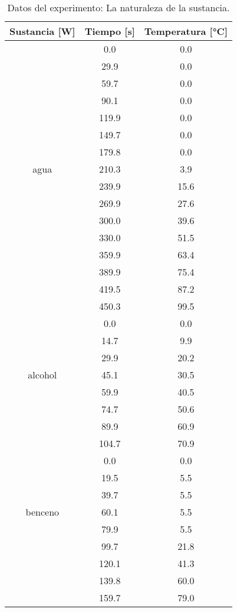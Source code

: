 \documentclass[a4paper, 12p]{article}
\begin{document}
\begin{table}[H]
      \centering
      \begin{tabular}{|c|c|c|}\hline
            Sustancia [W]& Tiempo [s] & Temperatura [°C]\\ \hline
                            &  0.0  &0.0\\
                            & 29.9  &0.0\\
                            & 59.7  &0.0\\
                            & 90.1  &0.0\\
                            & 119.9 &0.0\\
                            & 149.7 &0.0\\
                            & 179.8 &0.0\\
         agua               & 210.3 &3.9\\
                            & 239.9 &15.6\\
                            & 269.9 &27.6\\
                            & 300.0 &39.6\\
                            & 330.0 &51.5\\
                            & 359.9 &63.4\\
                            & 389.9 &75.4\\
                            & 419.5 &87.2\\
                            & 450.3 &99.5\\ \hline
                              & 0.0  & 0.0\\
                              & 14.7 & 9.9\\
                              & 29.9 & 20.2\\
         alcohol              & 45.1 & 30.5\\
                              & 59.9 & 40.5\\
                              & 74.7 & 50.6\\
                              & 89.9 & 60.9\\
                              & 104.7 & 70.9 \\ \hline
                              &0.0  &0.0\\
                              &19.5 &5.5\\
                              &39.7 &5.5 \\
        benceno               &60.1 &5.5\\
                              &79.9 &5.5\\
                              &99.7 &21.8\\
                              &120.1 &41.3\\
                              & 139.8 &60.0\\
                              &159.7 &79.0\\ \hline

      \end{tabular} 
      \label{tab: naturaleza}
      \caption[]{Datos del experimento: La naturaleza de la sustancia.}
\end{table}
\end{document}
